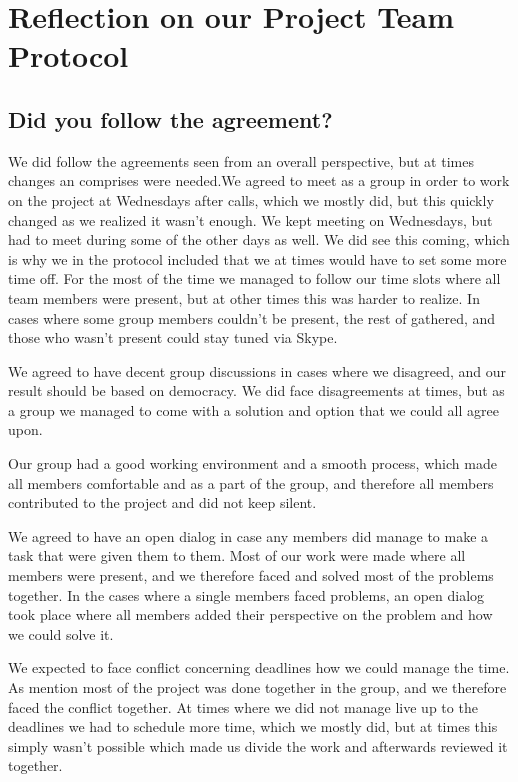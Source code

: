 \section*{Reflection on our Project Team Protocol}

\subsection*{Did you follow the agreement?}
 

We did follow the agreements seen from an overall perspective, but at times changes an comprises were needed.We agreed to meet as a group in order to work on the project at Wednesdays after calls, which we mostly did, but this quickly changed as we realized it wasn’t enough. We kept meeting on Wednesdays, but had to meet during some of the other days as well. We did see this coming, which is why we in the protocol included that we at times would have to set some more time off. For the most of the time we managed to follow our time slots where all team members were present, but at other times this was harder to realize. In cases where some group members couldn't be present, the rest of gathered, and those who wasn't present could stay tuned via Skype.


We agreed to have decent group discussions in cases where we disagreed, and our result should be based on democracy. We did face disagreements at times, but as a group we managed to come with a solution and option that we could all agree upon.


Our group had a good working environment and a smooth process, which made all members comfortable and as a part of the group, and therefore all members contributed to the project and did not keep silent.


We agreed to have an open dialog in case any members did manage to make a task that were given them to them. Most of our work were made where all members were present, and we therefore faced and solved most of the problems together. In the cases where a single members faced problems, an open dialog took place where all members added their perspective on the problem and how we could solve it. 


We expected to face conflict concerning deadlines how we could manage the time. As mention most of the project was done together in the group, and we therefore faced the conflict together. At times where we did not manage live up to the deadlines we had to schedule more time, which we mostly did, but at times this simply wasn't possible which made us divide the work and afterwards reviewed it together.


